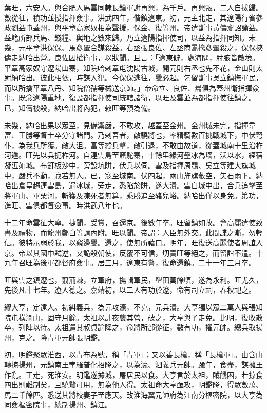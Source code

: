 \begin{pinyinscope}
葉旺，六安人。與合肥人馬雲同隸長鎗軍謝再興，為千戶。再興叛，二人自拔歸。數從征，積功並授指揮僉事。洪武四年，偕鎮遼東。初，元主北走，其遼陽行省參政劉益屯蓋州，與平章高家奴相為聲援，保金、復等州。帝遣斷事黃儔齎詔諭益。益籍所部兵馬、錢糧、輿地之數來歸。乃立遼陽指揮使司，以益為指揮同知。未幾，元平章洪保保、馬彥翬合謀殺益。右丞張良佐、左丞商暠擒彥翬殺之，保保挾儔走納哈出營。良佐因權衛事，以狀聞。且言：「遼東僻，處海隅，肘腋皆敵境。平章高家奴守遼陽山寨，知院哈剌章屯沈陽古城，開元則右丞也先不花，金山則太尉納哈出。彼此相依，時謀入犯。今保保逃往，釁必起。乞留斷事吳立鎮撫軍民，而以所擒平章八丹、知院僧孺等械送京師。」帝命立、良佐、暠俱為蓋州衛指揮僉事。既念遼陽重地，復設都指揮使司統轄諸衛，以旺及雲並為都指揮使往鎮之。已，知儔被殺，納哈出將內犯，敕旺等預為備。

未幾，納哈出果以眾至，見備禦嚴，不敢攻，越蓋至金州。金州城未完，指揮韋富、王勝等督士卒分守諸門。乃剌吾者，敵驍將也，率精騎數百挑戰城下，中伏弩仆，為我兵所獲。敵大沮。富等縱兵擊，敵引退，不敢由故道，從蓋城南十里沿柞河遁。旺先以兵扼柞河。自連雲島至窟駝寨，十餘里緣河壘冰為墻，沃以水，經宿凝沍如城。布釘板沙中，旁設坑阱，伏兵以伺。雲及指揮周鶚、吳立等建大旗城中，嚴兵不動，寂若無人。已，寇至城南。伏四起，兩山旌旗蔽空，矢石雨下。納哈出倉皇趨連雲島，遇冰城，旁走，悉陷於阱，遂大潰。雲自城中出，合兵追擊至將軍山、畢栗河，斬獲及凍死者無算，乘勝追至豬兒峪。納哈出僅以身免。第功，進旺、雲俱都督僉事。時洪武八年也。

十二年命雲征大寧。捷聞，受賞，召還京。後數年卒。旺留鎮如故。會高麗遣使致書及禮物，而龍州鄭白等請內附。旺以聞。帝謂：人臣無外交。此間諜之漸，勿輕信。彼特示弱於我，以窺邊釁。還之，使無所藉口。明年，旺復送高麗使者周誼入京。帝以其國中弒逆，又詭殺朝使，反覆不可信，切責旺等絕之，而留誼不遣。十九年召旺為後軍都督府僉事。居三月，遼東有警，復命還鎮。二十一年三月卒。

旺與雲之鎮遼也，翦荊棘，立軍府，撫輯軍民，墾田萬餘頃，遂為永利。旺尤久，先後凡十七年。遼人德之。嘉靖初，以二人有功於遼，命有司立祠，春秋祀之。

繆大亨，定遠人。初糾義兵，為元攻濠，不克，元兵潰。大亨獨以眾二萬人與張知院屯橫澗山，固守月餘。太祖以計夜襲其營，破之，大亨與子走免。比明，復收散卒，列陣以待。太祖遣其叔貞諭降之，命將所部從征，數有功，擢元帥。總兵取揚州，克之。降青軍元帥張明鑑。

初，明鑑聚眾淮西，以青布為號，稱「青軍」；又以善長槍，稱「長槍軍」。由含山轉掠揚州，元鎮南王孛羅普化招降之，以為濠、泗義兵元帥。踰年，食盡，謀擁王作亂。王走，死淮安。明鑑遂據城，屠居民以食。大亨言於太祖，賊饑困，若掠食四出則難制矣，且驍鷙可用，無為他人得。太祖命大亨亟攻，明鑑降，得眾數萬、馬二千餘匹。悉送其將校妻子至應天。改淮海翼元帥府為江南分樞密院，以大亨為同僉樞密院事，總制揚州、鎮江。


\end{pinyinscope}

